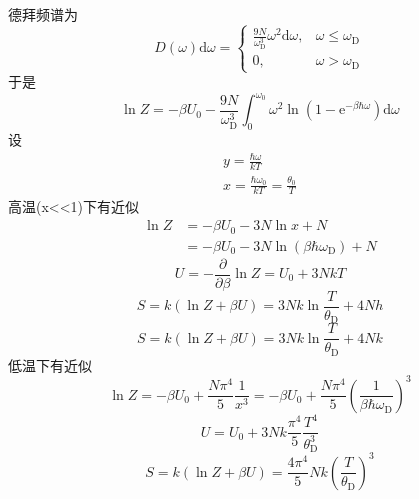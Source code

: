 \documentclass[UTF8,9pt]{ctexart}
\begin{document}
   德拜频谱为
   $$ 
D(\omega) \mathrm{d} \omega=\left\{\begin{array}{ll}{\frac{9 N}{\omega_{\mathrm{D}}^{3}} \omega^{2} \mathrm{d} \omega,} & {\omega \leq \omega_{\mathrm{D}}} \\ {0,} & {\omega>\omega_{\mathrm{D}}}\end{array}\right.
 $$于是$$ 
 \ln Z=-\beta U_{0}-\frac{9 N}{\omega_{\mathrm{D}}^{3}} \int_{0}^{\omega_{0}} \omega^{2} \ln \left(1-\mathrm{e}^{-\beta \hbar \omega}\right) \mathrm{d} \omega
  $$
  设$$ 
\begin{array}{c}{y=\frac{\hbar \omega}{k T}} \\ {x=\frac{\hbar \omega_{0}}{k T}=\frac{\theta_{0}}{T}}\end{array}
 $$
 高温(x<<1)下有近似
 $$ 
\begin{aligned} \ln Z &=-\beta U_{0}-3 N \ln x+N \\ &=-\beta U_{0}-3 N \ln \left(\beta \hbar \omega_{\mathrm{D}}\right)+N \end{aligned}
 $$$$ 
 U=-\frac{\partial}{\partial \beta} \ln Z=U_{0}+3 N k T
  $$$$ 
  S=k(\ln Z+\beta U)=3 N k \ln \frac{T}{\theta_{\mathrm{D}}}+4 N h
   $$$$ 
   S=k(\ln Z+\beta U)=3 N k \ln \frac{T}{\theta_{\mathrm{D}}}+4 N k
    $$低温下有近似$$ 
    \ln Z=-\beta U_{0}+\frac{N \pi^{4}}{5} \frac{1}{x^{3}} 
=-\beta U_{0}+\frac{N \pi^{4}}{5}\left(\frac{1}{\beta \hbar \omega_{\mathrm{D}}}\right)^{3}
 $$$$ 
 U=U_{0}+3 N k \frac{\pi^{4}}{5} \frac{T^{4}}{\theta_{\mathrm{D}}^{3}}
  $$$$ 
  S=k(\ln Z+\beta U)=\frac{4 \pi^{4}}{5} N k\left(\frac{T}{\theta_{\mathrm{D}}}\right)^{3}
   $$
\end{document}
